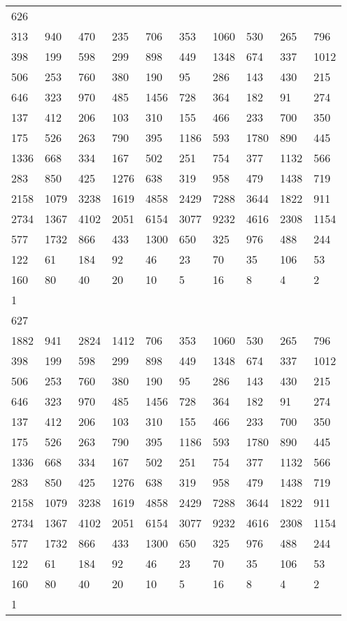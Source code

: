 \begin{longtable}{*{10}{l}}
626&&&&&&&&&\\
313& 940& 470& 235& 706& 353& 1060& 530& 265& 796\\
398& 199& 598& 299& 898& 449& 1348& 674& 337& 1012\\
506& 253& 760& 380& 190& 95& 286& 143& 430& 215\\
646& 323& 970& 485& 1456& 728& 364& 182& 91& 274\\
137& 412& 206& 103& 310& 155& 466& 233& 700& 350\\
175& 526& 263& 790& 395& 1186& 593& 1780& 890& 445\\
1336& 668& 334& 167& 502& 251& 754& 377& 1132& 566\\
283& 850& 425& 1276& 638& 319& 958& 479& 1438& 719\\
2158& 1079& 3238& 1619& 4858& 2429& 7288& 3644& 1822& 911\\
2734& 1367& 4102& 2051& 6154& 3077& 9232& 4616& 2308& 1154\\
577& 1732& 866& 433& 1300& 650& 325& 976& 488& 244\\
122& 61& 184& 92& 46& 23& 70& 35& 106& 53\\
160& 80& 40& 20& 10& 5& 16& 8& 4& 2\\
1& \\

627&&&&&&&&&\\
1882& 941& 2824& 1412& 706& 353& 1060& 530& 265& 796\\
398& 199& 598& 299& 898& 449& 1348& 674& 337& 1012\\
506& 253& 760& 380& 190& 95& 286& 143& 430& 215\\
646& 323& 970& 485& 1456& 728& 364& 182& 91& 274\\
137& 412& 206& 103& 310& 155& 466& 233& 700& 350\\
175& 526& 263& 790& 395& 1186& 593& 1780& 890& 445\\
1336& 668& 334& 167& 502& 251& 754& 377& 1132& 566\\
283& 850& 425& 1276& 638& 319& 958& 479& 1438& 719\\
2158& 1079& 3238& 1619& 4858& 2429& 7288& 3644& 1822& 911\\
2734& 1367& 4102& 2051& 6154& 3077& 9232& 4616& 2308& 1154\\
577& 1732& 866& 433& 1300& 650& 325& 976& 488& 244\\
122& 61& 184& 92& 46& 23& 70& 35& 106& 53\\
160& 80& 40& 20& 10& 5& 16& 8& 4& 2\\
1& \\


\end{longtable}
